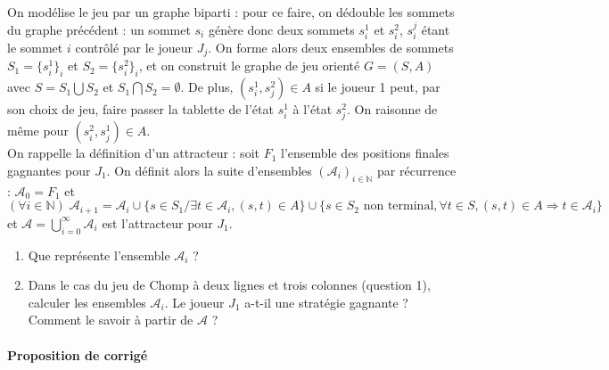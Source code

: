 \documentclass{ccinp}
\begin{document}
On modélise le jeu par un graphe biparti : pour ce faire, on dédouble les sommets du graphe précédent : un sommet $s_i$ génère donc deux sommets $s_i^1$ et $s_i^2$, $s_i^j$ étant le sommet $i$ contrôlé par le joueur $J_j$. On forme alors deux ensembles de sommets $S_1 = \{s_i^1\}_i$ et $S_2 = \{s_i^2\}_i$, et on construit le graphe de jeu orienté $G=(S,A)$ avec $S=S_1\bigcup S_2$ et $S_1\bigcap S_2=\emptyset$. De plus, $(s_i^1,s_j^2)\in A$ si le joueur 1 peut, par son choix de jeu, faire passer la tablette de l'état $s_i^1$ à l'état $s_j^2$. On raisonne de même pour $(s_i^2,s_j^1)\in A$.\\ 
On rappelle la définition d'un attracteur : soit $F_1$ l’ensemble des positions finales gagnantes pour $J_1$. On définit alors la suite d'ensembles $(\mathcal A_i)_{i\in\mathbb{N}}$ par récurrence : $\mathcal A_0=F_1$ et 
$$(\forall i\in\mathbb{N})\; \mathcal A_{i+1} = \mathcal A_i\cup\{s\in S_1/ \exists t\in \mathcal A_i, (s,t)\in A\}\cup \{s\in S_2\textrm{ non terminal}, \forall t\in S, (s,t)\in A \Rightarrow t\in \mathcal A_i\}$$
et  $\mathcal A = \displaystyle\bigcup_{i=0}^\infty \mathcal A_i$ est l'attracteur pour $J_1$.
\begin{enumerate}[resume]
\item Que représente l'ensemble $\mathcal A_{i}$ ?
\item Dans le cas du jeu de Chomp à deux lignes et trois colonnes (question 1), calculer les ensembles $\mathcal A_i$. Le joueur $J_1$ a-t-il une stratégie gagnante ? Comment le savoir à partir de $\mathcal A$ ?
\end{enumerate}

\paragraph*{Proposition de corrigé}
\end{document}
